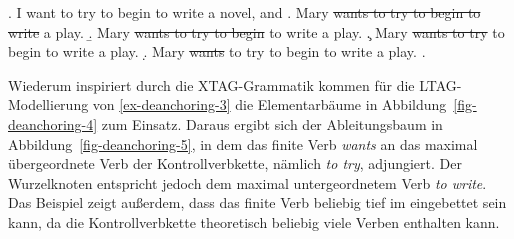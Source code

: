\newpage 
\ex. \label{ex-deanchoring-3} I want to try to begin to write a novel, and
\a. Mary \sout{wants to try to begin to write} a play.\label{ex-deanchoring-3-a}
\b. Mary \sout{wants to try to begin} to write a play.\label{ex-ross-70-b}
\c. Mary \sout{wants to try} to begin to write a play.\label{ex-ross-70-c}
\d. Mary \sout{wants} to try to begin to write a play.\label{ex-ross-70-d}
\z. \citep[(2-c)]{Ross:70}
 
Wiederum inspiriert durch die XTAG-Grammatik kommen für die LTAG-Model\-lie\-rung von \ref{ex-deanchoring-3} die Elementarbäume in Abbildung~\ref{fig-deanchoring-4} zum Einsatz. Daraus ergibt sich der Ableitungsbaum in Abbildung~\ref{fig-deanchoring-5}, in dem das finite Verb {\it wants} an das maximal übergeordnete Verb der Kontrollverbkette, nämlich {\it to try}, adjungiert. Der Wurzelknoten entspricht jedoch dem maximal untergeordnetem Verb {\it to write}. Das Beispiel zeigt au\ss erdem, dass das finite Verb beliebig tief im  eingebettet sein kann, da die Kontrollverbkette theoretisch beliebig viele Verben enthalten kann.



